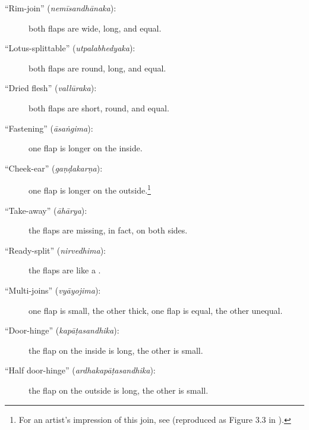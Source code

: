 \begin{translation}
\begin{description}
        \item[\mdseries``Rim-join'' (\emph{nemīsandhānaka}):]
        both flaps are wide, long, and equal.
        
        \item[\mdseries``Lotus-splittable'' (\emph{utpalabhedyaka}):]
        both flaps are round, long, and equal.
        
        \item[\mdseries``Dried flesh'' (\emph{vallūraka}):]
        both flaps are short, round, and equal.
        
        \item[\mdseries``Fastening'' (\emph{āsaṅgima}):]
        one flap is longer on the inside.
        
        \item[\mdseries``Cheek-ear'' (\emph{gaṇḍakarṇa}):]
        one flap is longer on the outside.\footnote{For an artist's impression of this join, see \cite[291]{majn-1975} (reproduced as Figure 3.3 in \cites[155]{wuja-2003}).}
        
        \item[\mdseries``Take-away'' (\emph{āhārya}):]
        the flaps are missing, in fact, on both sides.
        
        \item[\mdseries``Ready-split'' (\emph{nirvedhima}):]
        the flaps are like a .
        
        \item[\mdseries``Multi-joins'' (\emph{vyāyojima}):]
        one flap is small, the other thick, one flap is equal, the other unequal.
        
        \item[\mdseries``Door-hinge'' (\emph{kapāṭasandhika}):]
        the flap on the inside is long, the other is small.
        
        \item[\mdseries``Half door-hinge'' (\emph{ardhakapāṭasandhika}):]
        the flap on the outside is long, the other is small.
    \end{description}


\end{translation}
